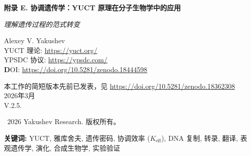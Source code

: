 \documentclass[12pt]{article}
\begin{document}
	
	\begin{titlepage}
		\begin{center}
			\vspace*{0cm}
			
			\Huge\textbf{附录 E. 协调遗传学：YUCT 原理在分子生物学中的应用}
			
			\vspace{1cm}
			
			\small\textit{理解遗传过程的范式转变}
			
			\vspace{1cm}
			\Large
			Alexey V. Yakushev\\
			
			YUCT 理论: \url{https://yuct.org/}\\
			YPSDC 协议: \url{https://ypsdc.com/}\\
			
			\vspace{2cm}
			\textbf DOI: \url{https://doi.org/10.5281/zenodo.18444598}\\
			
			\vspace{1cm}
			
			\vspace{0cm}
			\large 
			本工作的简短版本先前已发表，见 \url{https://doi.org/10.5281/zenodo.18362308}\\
			\vspace{1cm}
			2026年3月 \\ \large V.2.5.
			
			\vspace{4cm}
			\textcopyright~2026 Yakushev Research. 版权所有。
			
			\newpage	
			\begin{abstract}
				\noindent
				本工作通过雅库舍夫协调原则的视角对遗传过程进行了根本性的重新思考。我们证明遗传密码、DNA 复制、基因表达和演化代表了具有可测量效率 $K_{\text{eff}}$ 的协调过程。引入了新的数学模型，预测了先前无法解释的现象，并为可编程演化开辟了道路。该理论提供了跨越多个实验领域的可检验预言，从简单的实验室测试到复杂的基因工程项目。
			\end{abstract}
			
			\vspace{0cm}
			
			\noindent
			\textbf{关键词:} YUCT, 雅库舍夫, 遗传密码, 协调效率 ($K_{\text{eff}}$), DNA 复制, 转录, 翻译, 表观遗传学, 演化, 合成生物学, 实验验证
			
			\vspace{0.5cm}
			
		\end{center}
	\end{titlepage}
	
\end{document}
